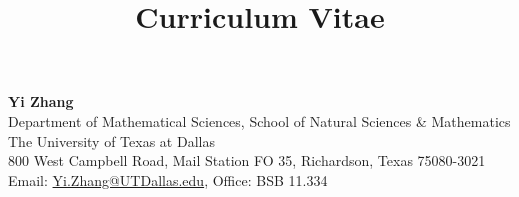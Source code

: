 \documentclass[a4paper,12pt]{article}
\title{\bf{\Huge{Curriculum Vitae}}}
\author{}
\date{}
\begin{document}
\maketitle
\thispagestyle{empty}

\begin{center}
    \textbf{Yi Zhang} \\
    Department of Mathematical Sciences, School of Natural Sciences \& Mathematics \\
    The University of Texas at Dallas \\
    800 West Campbell Road, Mail Station FO 35, Richardson, Texas 75080-3021 \\
    Email: \href{mailto:Yi.Zhang@UTDallas.edu}{Yi.Zhang@UTDallas.edu}, Office:  BSB 11.334
 \end{center}



\end{document}
